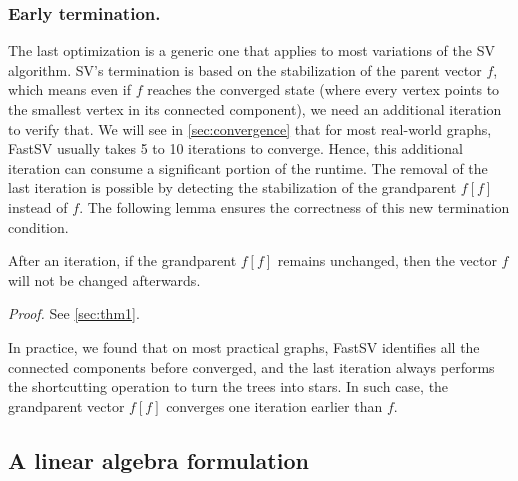 \documentclass{sokendai_thesis} %
\begin{document}
\subsubsection{Early termination.}
\label{sec:termination}

The last optimization is a generic one that applies to most variations of the SV algorithm.
SV's termination is based on the stabilization of the parent vector $f$, which means even if $f$ reaches the converged state (where every vertex points to the smallest vertex in its connected component), we need an additional iteration to verify that.
We will see in \autoref{sec:convergence} that for most real-world graphs, FastSV usually takes 5 to 10 iterations to converge.
Hence, this additional iteration can consume a significant portion of the runtime. %
The removal of the last iteration is possible by detecting the stabilization of the grandparent $f[f]$ instead of $f$.
The following lemma ensures the correctness of this new termination condition.
\begin{lemma}\label{thm1}
After an iteration, if the grandparent $f[f]$ remains unchanged, then the vector $f$ will not be changed afterwards.
\end{lemma}

\textit{Proof.} See \autoref{sec:thm1}.

In practice, we found that on most practical graphs, FastSV identifies all the connected components before converged, and the last iteration always performs the shortcutting operation to turn the trees into stars.
In such case, the grandparent vector $f[f]$ converges one iteration earlier than $f$.


\subsection{A linear algebra formulation}
\label{sec:sv-graphblas}
\end{document}
